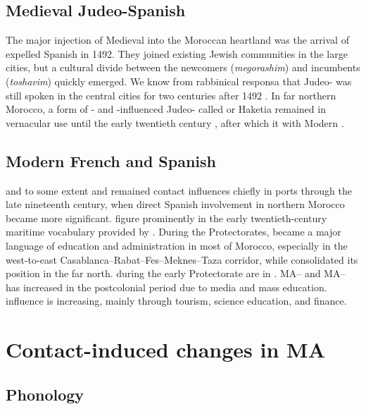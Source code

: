\documentclass[output=paper]{langsci/langscibook}
\begin{document}
\subsection{Medieval Judeo-Spanish}

The major injection of Medieval  into the Moroccan heartland was the arrival of expelled Spanish  in 1492. They joined existing Jewish communities in the large cities, but a cultural divide between the newcomers (\textit{megorashim}) and incumbents (\textit{toshavim}) quickly emerged. We know from rabbinical responsa that Judeo- was still spoken in the central cities for two centuries after 1492 \citep{Chetrit1985}. In far northern Morocco, a form of - and -influenced Judeo- called  or Haketia remained in vernacular use until the early twentieth century \citep{Benoliel1977}, after which it  with Modern .

\subsection{Modern French and Spanish}

 and to some extent  and  remained contact influences chiefly in ports through the late nineteenth century, when direct Spanish involvement in northern Morocco became more significant.   figure prominently in the early twentieth-century maritime vocabulary provided by \citet{Brunot1920}. During the Protectorates,  became a major language of education and administration in most of Morocco, especially in the west-to-east Casablanca–Rabat–Fes–Meknes–Taza corridor, while  consolidated its position in the far north.   during the early Protectorate are in \citet{Brunot1949}. MA– and MA–  has increased in the postcolonial period due to media and mass education.  influence is increasing, mainly through tourism, science education, and finance.

\section{Contact-induced changes in MA}\largerpage
\subsection{Phonology}
\end{document}
